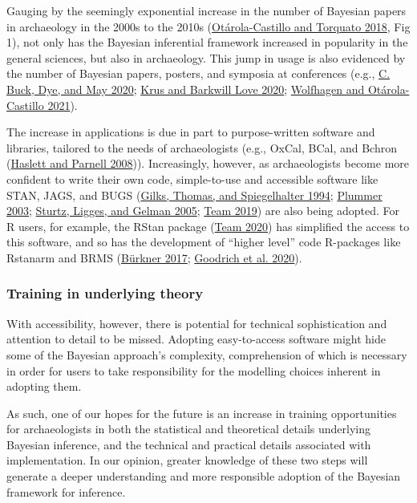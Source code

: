 \documentclass[
]{article}
\begin{document}
Gauging by the seemingly exponential increase in the number of Bayesian
papers in archaeology in the 2000s to the 2010s
(\protect\hyperlink{ref-otarola-castillo_bayesian_2018}{Otárola-Castillo
and Torquato 2018}, Fig 1), not only has the Bayesian inferential
framework increased in popularity in the general sciences, but also in
archaeology. This jump in usage is also evidenced by the number of
Bayesian papers, posters, and symposia at conferences (e.g.,
\protect\hyperlink{ref-buck_stratification_2020}{C. Buck, Dye, and May
2020}; \protect\hyperlink{ref-krus_big_2020}{Krus and Barkwill Love
2020}; \protect\hyperlink{ref-wolfhagen_bayesian_2021}{Wolfhagen and
Otárola-Castillo 2021}).

The increase in applications is due in part to purpose-written software
and libraries, tailored to the needs of archaeologists (e.g., OxCal,
BCal, and Bchron (\protect\hyperlink{ref-haslett_simple_2008}{Haslett
and Parnell 2008})). Increasingly, however, as archaeologists become
more confident to write their own code, simple-to-use and accessible
software like STAN, JAGS, and BUGS
(\protect\hyperlink{ref-gilks_language_1994}{Gilks, Thomas, and
Spiegelhalter 1994}; \protect\hyperlink{ref-plummer_jags_2003}{Plummer
2003}; \protect\hyperlink{ref-sturtz_r2winbugs_2005}{Sturtz, Ligges, and
Gelman 2005}; \protect\hyperlink{ref-team_rstan_2019}{Team 2019}) are
also being adopted. For R users, for example, the RStan package
(\protect\hyperlink{ref-team_rstan_2020}{Team 2020}) has simplified the
access to this software, and so has the development of ``higher level''
code R-packages like Rstanarm and BRMS
(\protect\hyperlink{ref-burkner_brms_2017}{Bürkner 2017};
\protect\hyperlink{ref-goodrich_rstanarm_2020}{Goodrich et al. 2020}).

\hypertarget{training-in-underlying-theory}{%
\subsubsection{Training in underlying
theory}\label{training-in-underlying-theory}}

With accessibility, however, there is potential for technical
sophistication and attention to detail to be missed. Adopting
easy-to-access software might hide some of the Bayesian approach's
complexity, comprehension of which is necessary in order for users to
take responsibility for the modelling choices inherent in adopting them.

As such, one of our hopes for the future is an increase in training
opportunities for archaeologists in both the statistical and theoretical
details underlying Bayesian inference, and the technical and practical
details associated with implementation. In our opinion, greater
knowledge of these two steps will generate a deeper understanding and
more responsible adoption of the Bayesian framework for inference.
\end{document}
